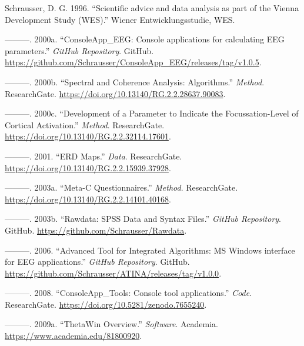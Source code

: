 \documentclass[
]{article}
\author{Dietmar Gerald SCHRAUSSER}
\date{14.04.2026}
\newlength{\cslhangindent}
\newlength{\cslentryspacingunit} %
\newenvironment{CSLReferences}[2] %
 {%
  \setlength{\parindent}{0pt}
  \ifodd #1
  \let\oldpar\par
  \def\par{\hangindent=\cslhangindent\oldpar}
  \fi
  \setlength{\parskip}{#2\cslentryspacingunit}
 }%
 {}
\begin{document}
\hypertarget{refs}{}
\begin{CSLReferences}{1}{0}
\leavevmode{}%
Schrausser, D. G. 1996. {``{Scientific advice and data analysis as part
of the Vienna Development Study (WES)}.''} Wiener Entwicklungsstudie,
WES.

\leavevmode{}%
---------. 2000a. {``{ConsoleApp\_EEG: Console applications for
calculating EEG parameters}.''} \emph{GitHub Repository}. GitHub.
\url{https://github.com/Schrausser/ConsoleApp_EEG/releases/tag/v1.0.5}.

\leavevmode{}%
---------. 2000b. {``{Spectral and Coherence Analysis: Algorithms}.''}
\emph{Method}. ResearchGate.
\url{https://doi.org/10.13140/RG.2.2.28637.90083}.

\leavevmode{}%
---------. 2000c. {``Development of a Parameter to Indicate the
Focussation-Level of Cortical Activation.''} \emph{Method}.
ResearchGate. \url{https://doi.org/10.13140/RG.2.2.32114.17601}.

\leavevmode{}%
---------. 2001. {``ERD Maps.''} \emph{Data}. ResearchGate.
\url{https://doi.org/10.13140/RG.2.2.15939.37928}.

\leavevmode{}%
---------. 2003a. {``{Meta-C Questionnaires}.''} \emph{Method}.
ResearchGate. \url{https://doi.org/10.13140/RG.2.2.14101.40168}.

\leavevmode{}%
---------. 2003b. {``{Rawdata: SPSS Data and Syntax Files}.''}
\emph{GitHub Repository}. GitHub.
\url{https://github.com/Schrausser/Rawdata}.

\leavevmode{}%
---------. 2006. {``{Advanced Tool for Integrated Algorithms: MS Windows
interface for EEG applications}.''} \emph{GitHub Repository}. GitHub.
\url{https://github.com/Schrausser/ATINA/releases/tag/v1.0.0}.

\leavevmode{}%
---------. 2008. {``{ConsoleApp\_Tools: Console tool applications}.''}
\emph{Code}. ResearchGate. \url{https://doi.org/10.5281/zenodo.7655240}.

\leavevmode{}%
---------. 2009a. {``{ThetaWin Overview}.''} \emph{Software}. Academia.
\url{https://www.academia.edu/81800920}.


\end{CSLReferences}
\end{document}
